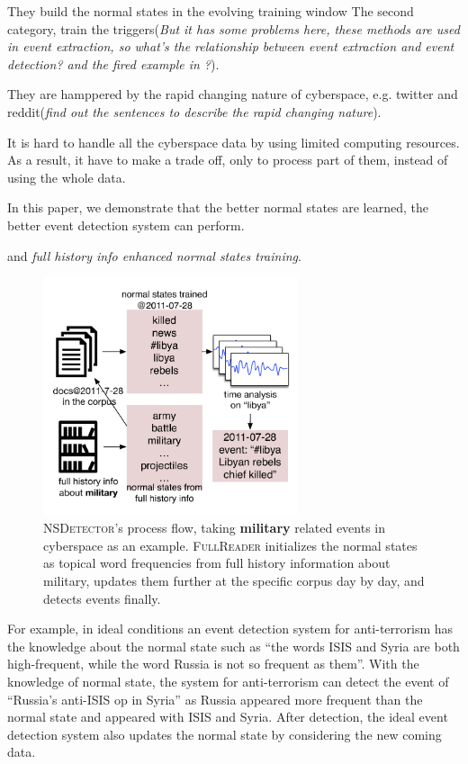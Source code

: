 \documentclass{sig-alternate-05-2015}
\begin{document}
They build the normal states in the evolving training window
The second category, train the triggers\cite{Li2013JointEE}\cite{Nguyen2015EventDA}(\textit{But it has some problems here, these methods are used in event extraction, so what's the relationship between event extraction and event detection? and the fired example in \cite{Li2013JointEE}?}). 

They are hamppered by the rapid changing nature of cyberspace, e.g. twitter and reddit(\textit{find out the sentences to describe the rapid changing nature}). 

It is hard to handle all the cyberspace data by using limited computing resources. As a result, it have to make a trade off, only to process part of them, instead of using the whole data. 



In this paper, we demonstrate that the better normal states  are learned, the better event detection system can perform.

 and \textit{full history info enhanced normal states training}. 

\begin{figure}
    \label{fig:modelDesc}
    \includegraphics[height=7.0cm]{img/systemExample.pdf}
    \caption{\textsc{NSDetector}'s process flow, taking \textbf{military} related events in cyberspace as an example. \textsc{FullReader} initializes the normal states as topical word frequencies from full history information about military, updates them further at the specific corpus day by day, and detects events finally.}
\end{figure}

For example, in ideal conditions an event detection system for anti-terrorism has the knowledge about the normal state such as “the words ISIS and Syria are both high-frequent, while the word Russia is not so frequent as them”. 
With the knowledge of normal state, the system for anti-terrorism can detect the event of “Russia's anti-ISIS op in Syria” as Russia appeared more frequent than the normal state and appeared with ISIS and Syria. 
After detection, the ideal event detection system also updates the normal state by considering the new coming data.
\end{document}
